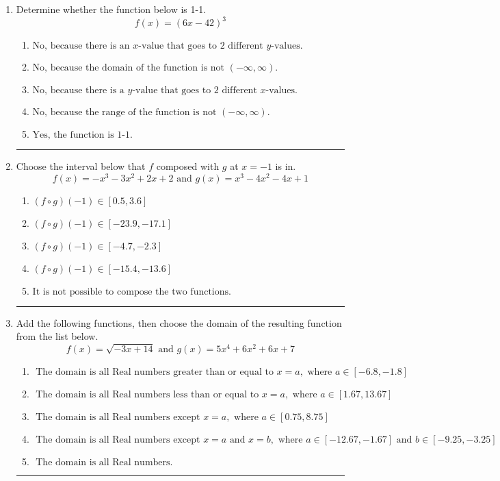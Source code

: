 \documentclass[14pt]{extbook}
\newcommand{\litem}[1]{\item#1\hspace*{-1cm}\rule{\textwidth}{0.4pt}}
\begin{document}
\begin{enumerate}
\litem{
Determine whether the function below is 1-1.\[ f(x) = (6 x - 42)^3 \]\begin{enumerate}[label=\Alph*.]
\item \( \text{No, because there is an $x$-value that goes to 2 different $y$-values.} \)
\item \( \text{No, because the domain of the function is not $(-\infty, \infty)$.} \)
\item \( \text{No, because there is a $y$-value that goes to 2 different $x$-values.} \)
\item \( \text{No, because the range of the function is not $(-\infty, \infty)$.} \)
\item \( \text{Yes, the function is 1-1.} \)

\end{enumerate} }
\litem{
Choose the interval below that $f$ composed with $g$ at $x=-1$ is in.\[ f(x) = -x^{3} -3 x^{2} +2 x + 2 \text{ and } g(x) = x^{3} -4 x^{2} -4 x + 1 \]\begin{enumerate}[label=\Alph*.]
\item \( (f \circ g)(-1) \in [0.5, 3.6] \)
\item \( (f \circ g)(-1) \in [-23.9, -17.1] \)
\item \( (f \circ g)(-1) \in [-4.7, -2.3] \)
\item \( (f \circ g)(-1) \in [-15.4, -13.6] \)
\item \( \text{It is not possible to compose the two functions.} \)

\end{enumerate} }
\litem{
Add the following functions, then choose the domain of the resulting function from the list below.\[ f(x) = \sqrt{-3x+14}  \text{ and } g(x) = 5x^{4} +6 x^{2} +6 x + 7 \]\begin{enumerate}[label=\Alph*.]
\item \( \text{ The domain is all Real numbers greater than or equal to } x = a, \text{ where } a \in [-6.8, -1.8] \)
\item \( \text{ The domain is all Real numbers less than or equal to } x = a, \text{ where } a \in [1.67, 13.67] \)
\item \( \text{ The domain is all Real numbers except } x = a, \text{ where } a \in [0.75, 8.75] \)
\item \( \text{ The domain is all Real numbers except } x = a \text{ and } x = b, \text{ where } a \in [-12.67, -1.67] \text{ and } b \in [-9.25, -3.25] \)
\item \( \text{ The domain is all Real numbers. } \)


\end{enumerate}}
\end{enumerate}
\end{document}
